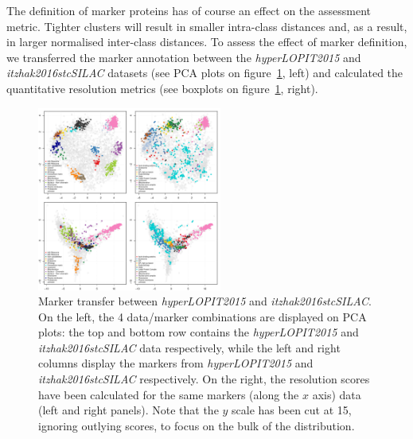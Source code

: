 \documentclass[12pt]{article}\usepackage[]{graphicx}\usepackage[]{color}
\begin{document}
The definition of marker proteins has of course an effect on the
assessment metric. Tighter clusters will result in smaller intra-class
distances and, as a result, in larger normalised inter-class
distances. To assess the effect of marker definition, we transferred
the marker annotation between the \textit{hyperLOPIT2015} and
\textit{itzhak2016stcSILAC} datasets (see PCA plots on
figure~\ref{fig:mrkswtch}, left) and calculated the quantitative
resolution metrics (see boxplots on figure~\ref{fig:mrkswtch},
right).

\begin{figure}[h]
  \centering
  \includegraphics[width = 0.54\textwidth]{mrkswtch-pca.pdf}
  \caption{Marker transfer between \textit{hyperLOPIT2015} and
    \textit{itzhak2016stcSILAC}. On the left, the 4 data/marker
    combinations are displayed on PCA plots: the top and bottom row
    contains the \textit{hyperLOPIT2015} and
    \textit{itzhak2016stcSILAC} data respectively, while the left and
    right columns display the markers from \textit{hyperLOPIT2015} and
    \textit{itzhak2016stcSILAC} respectively. On the right, the
    resolution scores have been calculated for the same markers (along
    the $x$ axis) data (left and right panels). Note that the $y$
    scale has been cut at 15, ignoring outlying scores, to focus on
    the bulk of the distribution. }
  \label{fig:mrkswtch}
\end{figure}
\end{document}
